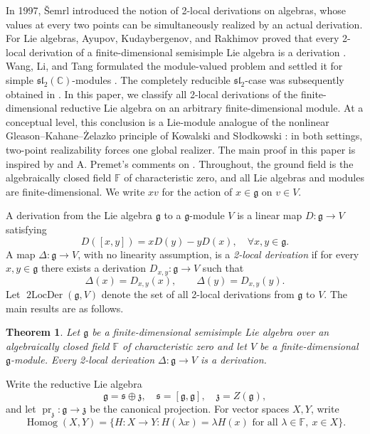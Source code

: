 \documentclass[12pt,reqno]{amsart}
\newtheorem{theorem}{Theorem}[section]
\theoremstyle{definition}
\theoremstyle{remark}
\numberwithin{equation}{section}
\newcommand{\F}{\mathbb{F}}
\newcommand{\C}{\mathbb{C}}
\newcommand{\g}{\mathfrak{g}}
\newcommand{\s}{\mathfrak{s}}
\newcommand{\z}{\mathfrak{z}}
\newcommand{\Homog}{\operatorname{Homog}}
\newcommand{\prz}{\operatorname{pr}_{\z}}
\begin{document}
In 1997, \v{S}emrl \cite{Sem} introduced the notion of 2-local derivations on algebras,
whose values at every two points can be simultaneously realized by an actual derivation.
For Lie algebras, Ayupov, Kudaybergenov, and Rakhimov proved that every
2-local derivation of a finite-dimensional semisimple Lie algebra is a derivation \cite{AyuKudRak}.
Wang, Li, and Tang formulated the
module-valued problem and settled it for simple
\(\mathfrak{sl}_2(\C)\)-modules \cite{WLT2022}. The completely
reducible \(\mathfrak{sl}_2\)-case was subsequently obtained in
\cite{WTL2025}.  In this paper, we classify all 2-local derivations of the finite-dimensional reductive Lie algebra on
an arbitrary finite-dimensional module. At a conceptual level, this conclusion is a Lie-module analogue of the
nonlinear Gleason--Kahane--\.Zelazko principle of Kowalski and S{\l}odkowski
\cite{KS}: in both settings, two-point realizability forces
one global realizer. The main proof in this paper is inspired by \cite{YZ} and A. Premet's comments on \cite{YZ}.
Throughout, the ground field is the algebraically closed field \(\F\) of
characteristic zero, and all Lie algebras and modules are finite-dimensional.
We write \(xv\) for the action of \(x\in\g\) on \(v\in V\).


A derivation from the Lie algebra \(\g\) to a \(\g\)-module \(V\) is a linear map
\(D\colon\g\to V\) satisfying
\[
  D([x,y])=xD(y)-yD(x),
  \quad \forall x,y\in\g.
\]
A map \(\Delta\colon\g\to V\), with no linearity assumption, is a
\emph{2-local derivation} if for every \(x,y\in\g\) there exists a derivation
\(D_{x,y}\colon\g\to V\) such that
\[
  \Delta(x)=D_{x,y}(x),
  \qquad
  \Delta(y)=D_{x,y}(y).
\]
Let \(\operatorname{2LocDer}(\g,V)\) denote the set of all 2-local derivations from \(\g\) to \(V\).
The main results are as follows.

\begin{theorem}\label{thm:semisimple}
Let \(\g\) be a finite-dimensional semisimple Lie algebra over an
algebraically closed field \(\F\) of characteristic zero and let \(V\) be
a finite-dimensional \(\g\)-module.  Every 2-local derivation
\(\Delta\colon\g\to V\) is a derivation.
\end{theorem}

Write the reductive Lie algebra
\[
 \g=\s\oplus\z,\quad
 \s=[\g,\g],\quad \z=Z(\g),
\]
and let \(\prz\colon\g\to\z\) be the canonical projection.  For vector
spaces \(X,Y\), write
\[
 \Homog(X,Y)
 =\{H\colon X\to Y:H(\lambda x)=\lambda H(x)
   \text{ for all }\lambda\in\F,\ x\in X\}.
\]
\end{document}
